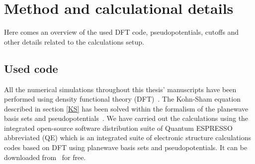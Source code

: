 \chapter{Method and calculational details}
\label{chapter:calcDetails}
Here comes an overview of the used DFT code, pseudopotentials, cutoffs and other details related to the calculations setup.
\section{Used code}
All the numerical simulations throughout this thesis' manuscripts have been performed using density functional theory (DFT)~\cite{Hohenberg1964, Kohn1965}. The Kohn-Sham equation described in section \ref{KS} has been solved within the formalism of the planewave basis sets and pseudopotentials~\cite{Vanderbilt1990}. We have carried out the calculations using the integrated open-source software distribution suite of Quantum ESPRESSO~\cite{Giannozzi2009} abbreviated (QE) which is an integrated suite of electronic structure calculations codes based on DFT using planewave basis sets and pseudopotentials. It can be downloaded from~\cite{QE_link} for free.
